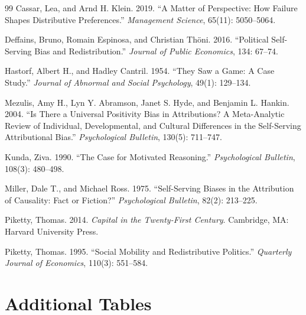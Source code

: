 \documentclass[12pt]{article}
\begin{document}
\begin{thebibliography}{99}
Cassar, Lea, and Arnd H. Klein. 2019.
``A Matter of Perspective: How Failure Shapes Distributive Preferences.''
\textit{Management Science}, 65(11): 5050--5064.

Deffains, Bruno, Romain Espinosa, and Christian Th\"oni. 2016.
``Political Self-Serving Bias and Redistribution.''
\textit{Journal of Public Economics}, 134: 67--74.

Hastorf, Albert H., and Hadley Cantril. 1954.
``They Saw a Game: A Case Study.''
\textit{Journal of Abnormal and Social Psychology}, 49(1): 129--134.

Mezulis, Amy H., Lyn Y. Abramson, Janet S. Hyde, and Benjamin L. Hankin. 2004.
``Is There a Universal Positivity Bias in Attributions? A Meta-Analytic Review
of Individual, Developmental, and Cultural Differences in the Self-Serving
Attributional Bias.''
\textit{Psychological Bulletin}, 130(5): 711--747.

Kunda, Ziva. 1990.
``The Case for Motivated Reasoning.''
\textit{Psychological Bulletin}, 108(3): 480--498.

Miller, Dale T., and Michael Ross. 1975.
``Self-Serving Biases in the Attribution of Causality: Fact or Fiction?''
\textit{Psychological Bulletin}, 82(2): 213--225.

Piketty, Thomas. 2014.
\textit{Capital in the Twenty-First Century}.
Cambridge, MA: Harvard University Press.

Piketty, Thomas. 1995.
``Social Mobility and Redistributive Politics.''
\textit{Quarterly Journal of Economics}, 110(3): 551--584.

\end{thebibliography}

\appendix

\section{Additional Tables}
\setcounter{table}{1}
\renewcommand{\thetable}{A\arabic{table}}
\renewcommand{\theHtable}{A\arabic{table}}




\end{document}
